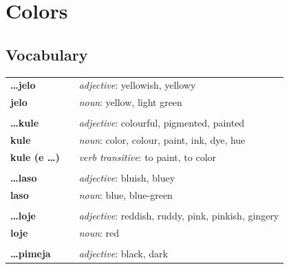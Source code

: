 
\section{Colors}
\subsection*{Vocabulary}
\begin{supertabular}{p{2,5cm}|ll}
    \textbf{\dots jelo}        &  & \textit{adjective}: yellowish, yellowy                                \\
    \textbf{jelo}              &  & \textit{noun}: yellow, light green                                    \\
                               &  &                                                                       \\
    \textbf{\dots kule}        &  & \textit{adjective}: colourful, pigmented, painted                     \\
    \textbf{kule}              &  & \textit{noun}: color, colour, paint, ink, dye, hue                    \\
    \textbf{kule (e \dots)}    &  & \textit{verb transitive}: to paint, to color                          \\
                               &  &                                                                       \\
    \textbf{\dots laso}        &  & \textit{adjective}: bluish, bluey                                     \\
    \textbf{laso}              &  & \textit{noun}: blue, blue-green                                       \\
                               &  &                                                                       \\
    \textbf{\dots loje}        &  & \textit{adjective}: reddish, ruddy, pink, pinkish, gingery            \\
    \textbf{loje}              &  & \textit{noun}: red                                                    \\
                               &  &                                                                       \\
    \textbf{\dots pimeja}      &  & \textit{adjective}: black, dark                                       \\

\end{supertabular}
